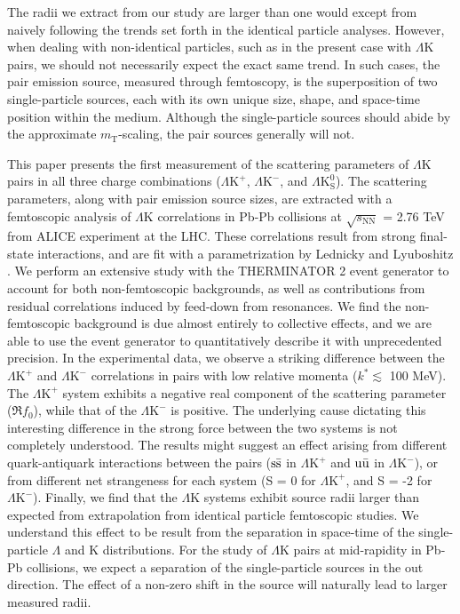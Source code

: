 \documentclass[ALICE,manyauthors]{cernphprep}
\newcommand{\kstar}{$k^{*}$\xspace}
\newcommand{\mt}{$m_{\mathrm{T}}$\xspace}
\newcommand{\Lam}{$\Lambda$\xspace}
\newcommand{\LamK}{$\Lambda$K\xspace}
\newcommand{\LamKchP}{$\Lambda\mathrm{K^{+}}$\xspace}
\newcommand{\LamKchM}{$\Lambda\mathrm{K^{-}}$\xspace}
\newcommand{\LamKs}{$\Lambda\mathrm{K^{0}_{S}}$\xspace}
\begin{document}
The radii we extract from our study are larger than one would except from naively following the trends set forth in the identical particle analyses.  
However, when dealing with non-identical particles, such as in the present case with \LamK pairs, we should not necessarily expect the exact same trend. 
In such cases, the pair emission source, measured through femtoscopy, is the superposition of two single-particle sources, each with its own unique size, shape, and space-time position within the medium.
Although the single-particle sources should abide by the approximate \mt-scaling, the pair sources generally will not.

This paper presents the first measurement of the scattering parameters of \LamK pairs in all three charge combinations (\LamKchP, \LamKchM, and \LamKs).
The scattering parameters, along with pair emission source sizes, are extracted with a femtoscopic analysis of \LamK correlations in Pb-Pb collisions at $\sqrt{s_{\mathrm{NN}}}$ = 2.76 TeV from ALICE experiment at the LHC.  
These correlations result from strong final-state interactions, and are fit with a parametrization by Lednicky and Lyuboshitz \cite{Lednicky:82}.  
We perform an extensive study with the THERMINATOR 2 event generator to account for both non-femtoscopic backgrounds, as well as contributions from residual correlations induced by feed-down from resonances.
We find the non-femtoscopic background is due almost entirely to collective effects, and we are able to use the event generator to quantitatively describe it with unprecedented precision.
In the experimental data, we observe a striking difference between the \LamKchP and \LamKchM correlations in pairs with low relative momenta (\kstar$\lesssim$ 100 MeV).
The \LamKchP system exhibits a negative real component of the scattering parameter ($\Re f_{0}$), while that of the \LamKchM is positive.
The underlying cause dictating this interesting difference in the strong force between the two systems is not completely understood.
The results might suggest an effect arising from different quark-antiquark interactions between the pairs ($\rm s\bar{s}$ in \LamKchP and $\rm u\bar{u}$ in \LamKchM), or from different net strangeness for each system (S = 0 for \LamKchP, and S = -2 for \LamKchM).  
Finally, we find that the \LamK systems exhibit source radii larger than expected from extrapolation from identical particle femtoscopic studies.
We understand this effect to be result from the separation in space-time of the single-particle \Lam and K distributions.
For the study of \LamK pairs at mid-rapidity in Pb-Pb collisions, we expect a separation of the single-particle sources in the out direction.
The effect of a non-zero shift in the source will naturally lead to larger measured radii.
\end{document}
